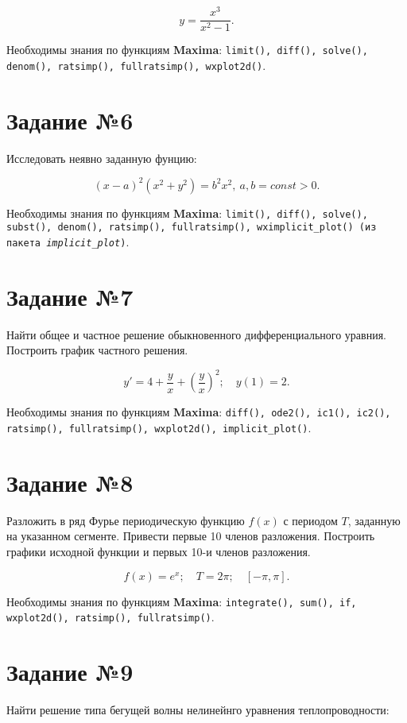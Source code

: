     \[
        y = \frac{x^{3}}{x^2 - 1}.
    \]
    
    Необходимы знания по функциям \textbf{Maxima}: {\tt limit(), diff(), solve(), denom(), ratsimp(), fullratsimp(), wxplot2d()}.
\section*{Задание №6}

	Исследовать неявно заданную фунцию:
	
	\[
	\left( x - a \right)^{2} \left( x^{2} + y^{2} \right) = b^{2} x^{2}, \: a, b = const > 0.
	\]
	
	Необходимы знания по функциям \textbf{Maxima}: {\tt limit(), diff(), solve(), subst(), denom(), ratsimp(), fullratsimp(), wximplicit\_plot() (из пакета \textit{implicit\_plot})}.

\section*{Задание №7}
    
    Найти общее и частное решение обыкновенного дифференциального уравния. Построить график частного решения.

    \[
        y' = 4 + \frac{y}{x} + \left( \frac{y}{x} \right)^{2}; \quad y(1) = 2.
    \]

    Необходимы знания по функциям \textbf{Maxima}: {\tt diff(), ode2(), ic1(), ic2(), ratsimp(), fullratsimp(), wxplot2d(), implicit\_plot()}.

\section*{Задание №8}
    
    Разложить в ряд Фурье периодическую функцию $f(x)$ с периодом $T$, заданную на указанном сегменте. Привести первые 10 членов разложения. Построить графики исходной функции и первых 10-и членов разложения.

    \[
        f(x) = e^{x}; \quad T = 2 \pi; \quad [-\pi, \pi].
    \]
    
    Необходимы знания по функциям \textbf{Maxima}: {\tt integrate(), sum(), if, wxplot2d(), ratsimp(), fullratsimp()}.

\section*{Задание №9}

    Найти решение типа бегущей волны нелинейнго уравнения теплопроводности: 

